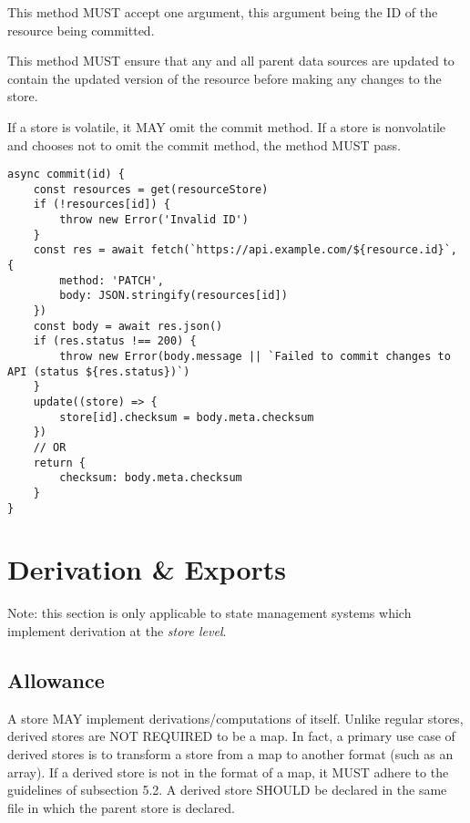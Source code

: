\documentclass{article}
\begin{document}
This method MUST accept one argument, this argument being the ID of the resource being committed.

This method MUST ensure that any and all parent data sources are updated to contain the updated version of the resource before making any changes to the store.

If a store is volatile, it MAY omit the commit method. If a store is nonvolatile and chooses not to omit the commit method, the method MUST pass.

\begin{lstlisting}[caption=Commit Method]
async commit(id) {
    const resources = get(resourceStore)
    if (!resources[id]) {
        throw new Error('Invalid ID')
    }
    const res = await fetch(`https://api.example.com/${resource.id}`, {
        method: 'PATCH',
        body: JSON.stringify(resources[id])
    })
    const body = await res.json()
    if (res.status !== 200) {
        throw new Error(body.message || `Failed to commit changes to API (status ${res.status})`)
    }
    update((store) => {
        store[id].checksum = body.meta.checksum
    })
    // OR
    return {
        checksum: body.meta.checksum
    }
}
\end{lstlisting}

\section{Derivation \& Exports}
Note: this section is only applicable to state management systems which implement derivation at the \emph{store level}.

\subsection{Allowance}
A store MAY implement derivations/computations of itself. Unlike regular stores, derived stores are NOT REQUIRED to be a map. In fact, a primary use case of derived stores is to transform a store from a map to another format (such as an array). If a derived store is not in the format of a map, it MUST adhere to the guidelines of subsection 5.2. A derived store SHOULD be declared in the same file in which the parent store is declared.
\end{document}
